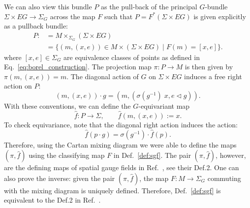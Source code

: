 \documentclass[aps,prx,reprint,superscriptaddress,twocolumn,amsmath,amssymb,amsfonts, nofootinbib]{revtex4-2}
\theoremstyle{apsstyle}
\begin{document}
\noindent We can also view this bundle $P$ as the pull-back of the principal $G$-bundle $\Sigma\times EG \to \Sigma_{G}$ across the map $F$ such that $P=F^*(\Sigma\times EG)$ is given explicitly as a pullback bundle:
\begin{align}
\label{eq:pgb}
    P:&=M \times_{\Sigma_{G}}(\Sigma\times EG)\\
    &= \{(m,(x,e))\in M\times(\Sigma\times EG)\;|\; F(m)=[x,e]\}.
    \nonumber
\end{align}
where $[x,e]\in \Sigma_{G}$ are equivalence classes of points as defined in Eq.~\ref{eq:borel_construction}. The projection map $\pi: P \to M$ is then given by $\pi(m, (x,e))=m$. The diagonal action of $G$ on $\Sigma\times EG$ induces a free right action on $P$:
\begin{equation*}
    (m,(x,e))\cdot g = (m,(\sigma(g^{-1})\;x, e\lhd g)).
\end{equation*}
With these conventions, we can define the $G$-equivariant map
\begin{equation*}
    \hat{f}: P \to \Sigma, \qquad \hat{f}(m,(x,e)):=x.
\end{equation*}
To check equivariance, note that the diagonal right action  induces the action:
\begin{equation*}
    \hat{f}(p\cdot g)= \sigma(g^{-1})\cdot \hat{f}(p).
\end{equation*}
Therefore, using the Cartan mixing diagram we were able to define the maps $(\pi,\hat{f})$ using the classifying map $F$ in Def.~\ref{def:sgf}. The pair $(\pi, \hat{f})$, however, are the defining maps of spatial gauge fields in Ref.~\cite{ThorngrenElse}, see their Def.2. One can also prove the inverse: given the pair $(\pi, \hat{f})$, the map $F: M \to \Sigma_{G}$ commuting with the mixing diagram is uniquely defined. Therefore, Def.~\ref{def:sgf} is equivalent to the Def.2 in Ref.~\cite{ThorngrenElse}.

\bigskip 
\end{document}
